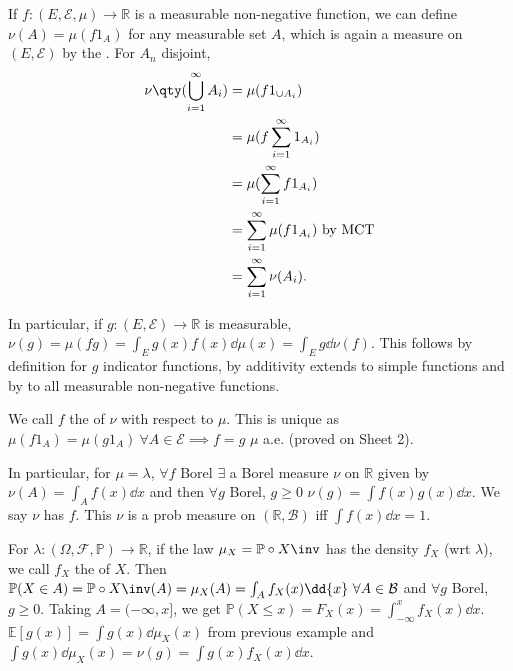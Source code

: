 \begin{example}
	If $f \colon (E, \mathcal E, \mu) \to \mathbb R$ is a measurable non-negative function, we can define $\nu(A) = \mu(f 1_A)$ for any measurable set $A$, which is again a measure on $(E, \mathcal E)$ by the .
	For $A_n$ disjoint,
	\begin{align*}
		\nu\qty(\bigcup_{i=1}^\infty A_i) &= \mu(f 1_{\cup A_i}) \\
		&= \mu(f \sum_{i=1}^{\infty} 1_{A_i}) \\
		&= \mu(\sum_{i=1}^{\infty} f 1_{A_i}) \\
		&= \sum_{i=1}^{\infty} \mu(f 1_{A_i}) \text{ by MCT} \\
		&= \sum_{i=1}^{\infty} \nu(A_i).
	\end{align*}

	In particular, if $g \colon (E, \mathcal E) \to \mathbb R$ is measurable, $\nu(g) = \mu(fg) = \int_E g(x) f(x) \dd{\mu(x)} = \int_E g \dd{\nu(f)}$.
	This follows by definition for $g$ indicator functions, by additivity extends to simple functions and by  to all measurable non-negative functions.

	We call $f$ the  of $\nu$ with respect to $\mu$.
	This is unique as $\mu(f 1_A) = \mu(g 1_A) \ \forall A \in \mathcal{E} \implies f = g$ $\mu$ a.e. (proved on Sheet 2).

	In particular, for $\mu = \lambda$, $\forall f$ Borel $\exists$ a Borel measure $\nu$ on $\mathbb{R}$ given by $\nu(A) = \int_A f(x) \dd{x}$ and then $\forall g$ Borel, $g \geq 0$ $\nu(g) = \int f(x) g(x) \dd{x}$.
	We say $\nu$ has  $f$.
	This $\nu$ is a prob measure on $(\mathbb{R}, \mathcal{B})$ iff $\int f(x) \dd{x} = 1$.

	For $\lambda : (\Omega, \mathcal{F}, \mathbb{P}) \to \mathbb{R}$, if the law $\mu_X = \mathbb{P} \circ X\inv$ has the density $f_X$ (wrt $\lambda$), we call $f_X$ the  of $X$.
	Then $\mathbb{P}(X \in A) = \mathbb{P} \circ X\inv (A) = \mu_X(A) = \int_A f_X(x) \dd{x} \ \forall A \in \mathcal{B}$ and $\forall g$ Borel, $g \geq 0$.
	Taking $A = (-\infty, x]$, we get $\mathbb{P}(X \leq x) = F_X(x) = \int_{-\infty}^{x} f_X(x) \dd{x}$. \\
	$\mathbb{E}[g(x)] = \int g(x) \dd{\mu_X(x)}$ from previous example and $\int g(x) \dd{\mu_X(x)} = \nu(g) = \int g(x) f_X(x) \dd{x}$.
\end{example}

